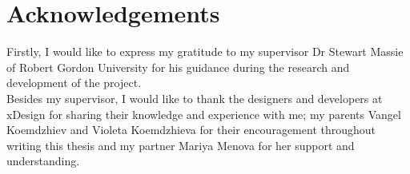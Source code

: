 \chapter{Acknowledgements}
Firstly, I would like to express my gratitude to my supervisor Dr Stewart Massie of Robert Gordon University for his guidance during the research and development of the project. \\

\noindent Besides my supervisor, I would like to thank the designers and developers at xDesign for sharing their knowledge and experience with me; my parents Vangel Koemdzhiev and Violeta Koemdzhieva for their encouragement throughout writing this thesis and my partner Mariya Menova for her support and understanding.
